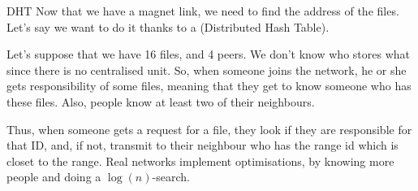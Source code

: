 \documentclass[a4paper]{article}
\begin{document}
\begin{parag}{DHT}
    Now that we have a magnet link, we need to find the address of the files. Let's say we want to do it thanks to a  (Distributed Hash Table).

    Let's suppose that we have 16 files, and 4 peers. We don't know who stores what since there is no centralised unit. So, when someone joins the network, he or she gets responsibility of some files, meaning that they get to know someone who has these files. Also, people know at least two of their neighbours. 


    Thus, when someone gets a request for a file, they look if they are responsible for that ID, and, if not, transmit to their neighbour who has the range id which is closet to the range. Real networks implement optimisations, by knowing more people and doing a $\log\left(n\right)$-search.
\end{parag}
\end{document}
